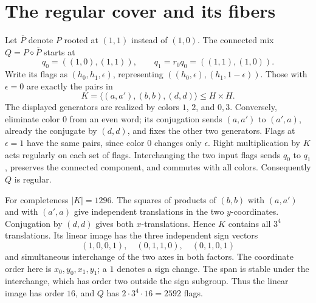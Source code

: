 \documentclass[a4paper,11pt]{article}
\newcommand{\gen}[1]{\langle#1\rangle}
\newcommand{\mix}{\mathbin{\diamond}}\newcommand{\Aut}{\operatorname{Aut}}
\begin{document}
\section{The regular cover and its fibers}
Let $\overline P$ denote $P$ rooted at $(1,1)$ instead of $(1,0)$.
The connected mix $Q=P\mix\overline P$ starts at
\[
 q_0=((1,0),(1,1)),\qquad q_1=r_0q_0=((1,1),(1,0)).
\]
Write its flags as $(h_0,h_1,\epsilon)$, representing
$((h_0,\epsilon),(h_1,1-\epsilon))$. Those with $\epsilon=0$ are
exactly the pairs in
\[
 K=\gen{(a,a'),(b,b),(d,d)}\leq H\times H.           \tag{4}
\]
The displayed generators are realized by colors $1$, $2$, and $0,3$.
Conversely, eliminate color $0$ from an even word; its conjugation sends
$(a,a')$ to $(a',a)$, already the conjugate by $(d,d)$, and fixes the
other two generators. Flags at $\epsilon=1$ have the same pairs, since
color $0$ changes only $\epsilon$. Right multiplication by $K$ acts
regularly on each set of flags. Interchanging the two input flags sends
$q_0$ to $q_1$, preserves the connected component, and commutes with
all colors. Consequently $Q$ is regular.

For completeness $|K|=1296$. The squares of products of $(b,b)$
with $(a,a')$ and with $(a',a)$ give independent translations in the
two $y$-coordinates. Conjugation by $(d,d)$ gives both $x$-translations.
Hence $K$ contains all $3^4$ translations. Its linear image has the
three independent sign vectors
\[
 (1,0,0,1),\quad(0,1,1,0),\quad(0,1,0,1)
\]
and simultaneous interchange of the two axes in both factors.
The coordinate order here is $x_0,y_0,x_1,y_1$; a $1$ denotes a sign
change. The span is stable under the interchange, which has order two
outside the sign subgroup. Thus the linear image has order $16$,
and $Q$ has $2\cdot3^4\cdot16=2592$ flags.
\end{document}
